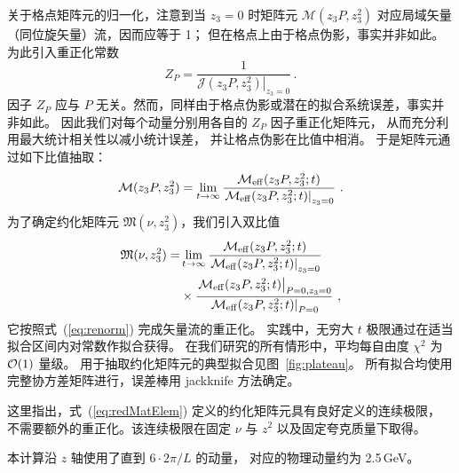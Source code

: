 关于格点矩阵元的归一化，注意到当 $z_3=0$ 时矩阵元
 $\mathcal{M}(z_3 P, z_3^2)$ 对应局域矢量（同位旋矢量）流，因而应等于 1；
但在格点上由于格点伪影，事实并非如此。
为此引入重正化常数
 \begin{equation}
 Z_P = \frac{1}{ \left.\mathcal{J}(z_3 P, z_3^2)\right|_{z_3=0}}\, .
 \label{eq:renorm}
 \end{equation}
因子 $Z_P$ 应与 $P$ 无关。然而，同样由于格点伪影或潜在的拟合系统误差，事实并非如此。
因此我们对每个动量分别用各自的 $Z_P$ 因子重正化矩阵元，
从而充分利用最大统计相关性{以减小统计误差}，
并让格点伪影在比值中相消。
于是矩阵元通过如下比值抽取：
  \begin{equation}
\mathcal{M}(z_3 P, z_3^2)= \lim_{t\rightarrow\infty}  \frac{\mathcal{M}_{\rm eff}(z_3 P, z_3^2;t)}{\left.\mathcal{M}_{\rm eff}(z_3 P, z_3^2;t)\right|_{z_3=0}}  \  .
 \end{equation}
为了确定约化矩阵元 $\mathfrak{M}(\nu,z_3^2)$，我们引入双比值
 \begin{align}
\mathfrak{M}(\nu, z_3^2)=&  \lim_{t\rightarrow\infty}
 \frac{\mathcal{M}_{\rm eff}(z_3 P, z_3^2;t)}{\left.\mathcal{M}_{\rm eff}(z_3 P, z_3^2;t)\right|_{z_3=0}} \nonumber \\
 &\times
\frac{\left.\mathcal{M}_{\rm eff}(z_3  P, z_3^2;t)\right|_{P=0,z_3=0}}
{\left.\mathcal{M}_{\rm eff}(z_3  P, z_3^2;t)\right|_{P=0}}  \ ,
\label{eq:redMatElem}
 \end{align}
它按照式~(\ref{eq:renorm}) 完成矢量流的重正化。
实践中，无穷大 $t$ 极限通过在适当拟合区间内对常数作拟合获得。
在我们研究的所有情形中，平均每自由度 $\chi^2$ 为 ${\cal O}(1)$ 量级。
用于抽取约化矩阵元的典型拟合见图~\ref{fig:plateau}。
所有拟合均使用完整协方差矩阵进行，误差棒用 jackknife 方法确定。

这里指出，式~(\ref{eq:redMatElem}) 定义的约化矩阵元具有良好定义的连续极限，
不需要额外的重正化。该连续极限在固定 $\nu$ 与 $z^2$ 以及固定夸克质量下取得。

本计算沿 $z$ 轴使用了直到 $6\cdot 2\pi/L $ 的动量，
对应的物理动量约为 2.5\,GeV。
